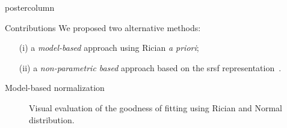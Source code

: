 \documentclass[final, size=a0]{beamer}
\begin{document}
\begin{frame}
\begin{columns}
\begin{column}{.33\textwidth}
\begin{beamercolorbox}[center,wd=\textwidth]{postercolumn}
\begin{minipage}[T]{.95\textwidth}
{            \vspace{.5cm}

            \begin{exampleblock}{Contributions}
              \justifying
              We proposed two alternative methods:
              \begin{itemize}
              \justifying
              \item[(i)] a \emph{model-based} approach using Rician \textit{a priori};
              \item[(ii)] a \emph{non-parametric based} approach based on the \ac{srsf} representation~\cite{Srivastava2011}.
              \end{itemize}
            \end{exampleblock}

            \vspace{.5cm}

            \begin{alertblock}{Model-based normalization}
            
              \begin{figure}
                \centering
                \hfill
                \hfill
                \caption{Visual evaluation of the goodness of fitting using Rician and Normal distribution.}
                \label{fig:fitting}
              \end{figure}


\end{alertblock}}
\end{minipage}
\end{beamercolorbox}
\end{column}
\end{columns}
\end{frame}
\end{document}
